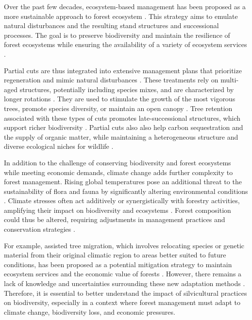 Over the past few decades, ecosystem-based management has been proposed as a more sustainable approach to forest ecosystem \citep{Perry1998scientificbasis,Kuuluvainen2002Naturalvariabilitya}. 
This strategy aims to emulate natural disturbances and the resulting stand structures and successional processes.
The goal is to preserve biodiversity and maintain the resilience of forest ecosystems while ensuring the availability of a variety of ecosystem services \citep{Szaro1998emergenceecosystem,MacDicken2015Globalprogress}. 

Partial cuts are thus integrated into extensive management plans that prioritize regeneration and mimic natural disturbances \citep{Irland2011Timberproductivity}. 
These treatments rely on multi-aged structures, potentially including species mixes, and are characterized by longer rotations \citep{Kuuluvainen2009Forestmanagement}. 
They are used to stimulate the growth of the most vigorous trees, promote species diversity, or maintain an open canopy \citep{Irland2011Timberproductivity}.
Tree retention associated with these types of cuts promotes late-successional structures, which support richer biodiversity \citep{Ameray2021Forestcarbon}. 
Partial cuts also also help carbon sequestration and the supply of organic matter, while maintaining a heterogeneous structure and diverse ecological niches for wildlife \citep{Dahlgren1994effectswholetree,Barg1999Influencepartial,Tong2020Forestmanagement,Ameray2021Forestcarbon}. 

In addition to the challenge of conserving biodiversity and forest ecosystems while meeting economic demands, climate change adds further complexity to forest management. 
Rising global temperatures pose an additional threat to the sustainability of flora and fauna by significantly altering environmental conditions \citep{McKenney2009Climatechange,Trumbore2015Foresthealth,Seidl2017Forestdisturbances,Messier2022Warningnatural}.  
Climate stresses often act additively or synergistically with forestry activities, amplifying their impact on biodiversity and ecosystems \citep{Brook2008Synergiesextinction,Tremblay2018Harvestinginteracts,Ochs2022Responseterrestrial,Bouderbala2023Longtermeffect}. 
Forest composition could thus be altered, requiring adjustments in management practices and conservation strategies \citep{McKenney2009Climatechange,Chmura2011Forestresponses,Lo2011Linkingclimate}. 

For example, assisted tree migration, which involves relocating species or genetic material from their original climatic region to areas better suited to future conditions, 
has been proposed as a potential mitigation strategy to maintain ecosystem services and the economic value of forests \citep{Vitt2010Assistedmigration,Pedlar2011implementationassisted,Ste-Marie2011Assistedmigration,Winder2011Ecologicalimplications}. 
However, there remains a lack of knowledge and uncertainties surrounding these new adaptation methods \citep{Klenk2015assistedmigration,Park2018Informationunderload}. 
Therefore, it is essential to better understand the impact of silvicultural practices on biodiversity, especially in a context where forest management must adapt to climate change, biodiversity loss, and economic pressures.

